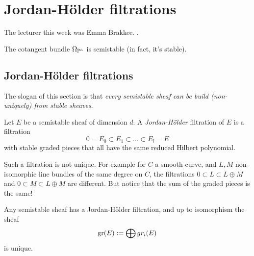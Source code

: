 \newcommand{\holder}{Hölder\xspace}
\chapter{Jordan-\holder filtrations}
The lecturer this week was Emma Brakkee.
.
\newline
{}

\begin{example}
	The cotangent bundle $\Omega_{\mathbb{P}^n}$ is semistable (in fact, it's stable).
\end{example}

\section{Jordan-\holder filtrations}
The slogan of this section is that \emph{every semistable sheaf can be build (non-uniquely) from stable sheaves}.

\begin{definition}
	Let $E$ be a semistable sheaf of dimension $d$. A \emph{Jordan-\holder} filtration of $E$ is a filtration \[
    	0 = E_0 \subset E_1 \subset \dots \subset E_l = E
    \] with stable graded pieces that all have the same reduced Hilbert polynomial.
\end{definition}
\begin{rmk}
	Such a filtration is not unique. For example for $C$ a smooth curve, and $L,M$ non-isomorphic line bundles of the same degree on $C$, the filtrations $0 \subset L \subset L \oplus M$ and $0 \subset M \subset L \oplus M$ are different. But notice that the sum of the graded pieces is the same!
\end{rmk}

\begin{theorem}
	Any semistable sheaf has a Jordan-\holder filtration, and up to isomorphism the sheaf \[
    	\operatorname{gr}(E) := \bigoplus gr_i(E)
    \] is unique.
\end{theorem}
